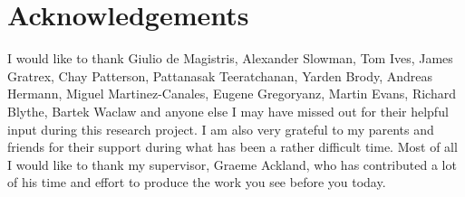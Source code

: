 \chapter{Acknowledgements}

\noindent

\normalsize

I would like to thank Giulio de Magistris, Alexander Slowman, Tom Ives, James Gratrex, Chay Patterson,
Pattanasak Teeratchanan, Yarden Brody, Andreas Hermann, Miguel Martinez-Canales, Eugene Gregoryanz,
Martin Evans,
Richard Blythe, Bartek Waclaw and anyone else I may have missed out for their helpful input during this research project. I am also very
grateful to my parents and friends for their support during what has been a rather difficult time.
Most of all I would like to thank my supervisor, Graeme Ackland, who has contributed a lot of his time
and effort to produce the work you see before you today.

